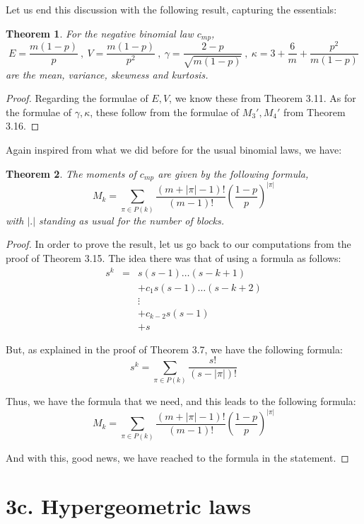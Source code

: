 \documentclass[12pt]{amsbook}
\newtheorem{theorem}{Theorem}[chapter]
\begin{document}
Let us end this discussion with the following result, capturing the essentials:

\begin{theorem}
For the negative binomial law $c_{mp}$,
$$E=\frac{m(1-p)}{p}\ ,\  V=\frac{m(1-p)}{p^2}\ ,\ \gamma=\frac{2-p}{\sqrt{m(1-p)}}\ ,\ \kappa=3+\frac{6}{m}+\frac{p^2}{m(1-p)}$$
are the mean, variance, skewness and kurtosis.
\end{theorem}

\begin{proof}
Regarding the formulae of $E,V$, we know these from Theorem 3.11. As for the formulae of $\gamma,\kappa$, these follow from the formulae of $M_3',M_4'$ from Theorem 3.16.
\end{proof}

Again inspired from what we did before for the usual binomial laws, we have:

\begin{theorem}
The moments of $c_{mp}$ are given by the following formula,
$$M_k=\sum_{\pi\in P(k)}\frac{(m+|\pi|-1)!}{(m-1)!}\left(\frac{1-p}{p}\right)^{|\pi|}$$
with $|.|$ standing as usual for the number of blocks.
\end{theorem}

\begin{proof}
In order to prove the result, let us go back to our computations from the proof of Theorem 3.15. The idea there was that of using a formula as follows:
\begin{eqnarray*}
s^k
&=&s(s-1)\ldots(s-k+1)\\
&&+c_1s(s-1)\ldots (s-k+2)\\
&&\vdots\\
&&+c_{k-2}s(s-1)\\
&&+s
\end{eqnarray*}

But, as explained in the proof of Theorem 3.7, we have the following formula:
$$s^k=\sum_{\pi\in P(k)}\frac{s!}{(s-|\pi|)!}$$

Thus, we have the formula that we need, and this leads to the following formula:
$$M_k=\sum_{\pi\in P(k)}\frac{(m+|\pi|-1)!}{(m-1)!}\left(\frac{1-p}{p}\right)^{|\pi|}$$

And with this, good news, we have reached to the formula in the statement.
\end{proof}

\section*{3c. Hypergeometric laws}
\end{document}
